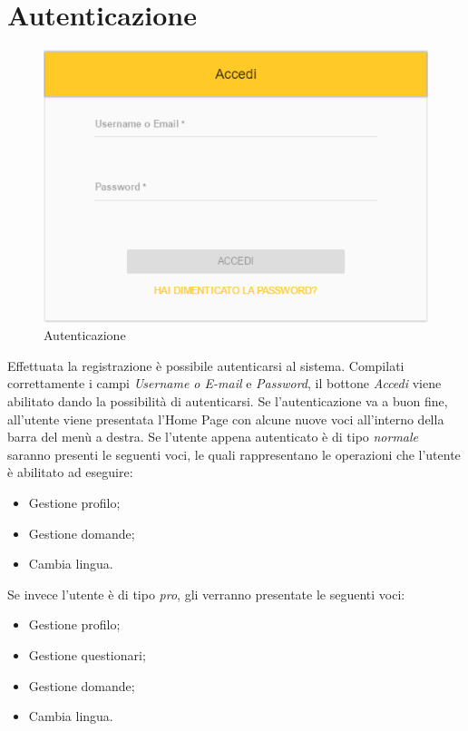 \newpage
\section{Autenticazione}

\label{Autenticazione}
\begin{figure}[ht]
	\centering
	\includegraphics[scale=0.65]{img/autenticazione.png}
	\caption{Autenticazione}
\end{figure}
\FloatBarrier

Effettuata la registrazione è possibile autenticarsi al sistema. Compilati correttamente i campi \textit{Username o E-mail} e \textit{Password}, il bottone \textit{Accedi} viene abilitato dando la possibilità di autenticarsi. Se l'autenticazione va a buon fine, all'utente viene presentata l'Home Page con alcune nuove voci all'interno della barra del menù a destra. Se l'utente appena autenticato è di tipo \textit{normale} saranno presenti le seguenti voci, le quali rappresentano le operazioni che l'utente è abilitato ad eseguire:
\begin{itemize}
	\item Gestione profilo;
	\item Gestione domande;
	\item Cambia lingua.
\end{itemize}
Se invece l'utente è di tipo \textit{pro}, gli verranno presentate le seguenti voci:
\begin{itemize}
	\item Gestione profilo;
	\item Gestione questionari;
	\item Gestione domande;
	\item Cambia lingua. 
\end{itemize}